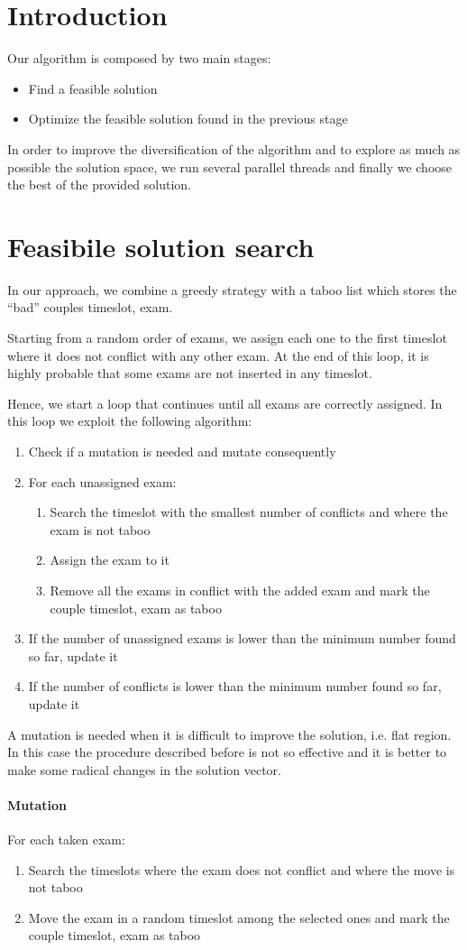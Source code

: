 \section*{Introduction}
Our algorithm is composed by two main stages:
\begin{itemize}
\item Find a feasible solution
\item Optimize the feasible solution found in the previous stage
\end{itemize}

In order to improve the diversification of the algorithm and to explore as much as possible the solution space, we run several parallel threads and finally we choose the best of the provided solution.

\section*{Feasibile solution search}
In our approach, we combine a greedy strategy with a taboo list which stores the ``bad'' couples timeslot, exam.

Starting from a random order of exams, we assign each one to the first timeslot where it does not conflict with any other exam. At the end of this loop, it is highly probable that some exams are not inserted in any timeslot.

Hence, we start a loop that continues until all exams are correctly assigned. In this loop we exploit the following algorithm:
\begin{enumerate}
\item Check if a mutation is needed and mutate consequently
\item For each unassigned exam:
\begin{enumerate}
\item Search the timeslot with the smallest number of conflicts and where the exam is not taboo
\item Assign the exam to it
\item Remove all the exams in conflict with the added exam and mark the couple timeslot, exam as taboo
\end{enumerate} 
\item If the number of unassigned exams is lower than the minimum number found so far, update it
\item If the number of conflicts is lower than the minimum number found so far, update it
\end{enumerate}
A mutation is needed when it is difficult to improve the solution, i.e. flat region. In this case the procedure described before is not so effective and it is better to make some radical changes in the solution vector.
\paragraph*{Mutation}
For each taken exam:
\begin{enumerate}
\item Search the timeslots where the exam does not conflict and where the move is not taboo
\item Move the exam in a random timeslot among the selected ones and mark the couple timeslot, exam as taboo
\end{enumerate}